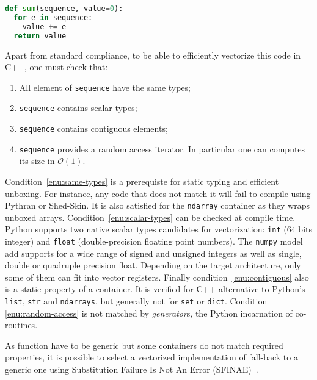 \documentclass[preprint]{sigplanconf}
\begin{document}
\begin{lstlisting}[language=python, label={lst:sum-py}, caption={Pseudo code of the \texttt{sum} intrinsic.}]
def sum(sequence, value=0):
  for e in sequence:
    value += e
  return value
\end{lstlisting}


Apart from standard compliance, to be able to efficiently vectorize this code in C++, one must check that:

\begin{enumerate}
    \item\label{enu:same-types} All element of \texttt{sequence} have the same types;
    \item\label{enu:scalar-types} \texttt{sequence} contains scalar types;
    \item\label{enu:contiguous} \texttt{sequence} contains contiguous elements;
    \item\label{enu:random-access} \texttt{sequence} provides a random access iterator. In particular one can computes its size in $\mathcal{O}(1)$.
\end{enumerate}

Condition~\ref{enu:same-types} is a prerequiste for static typing and efficient
unboxing. For instance, any code that does not match it will fail to compile
using Pythran or Shed-Skin. It is also satisfied for the \texttt{ndarray}
container as they wraps unboxed arrays. Condition~\ref{enu:scalar-types} can be
checked at compile time. Python supports two native scalar types candidates for
vectorization: \texttt{int} (64 bits integer) and \texttt{float}
(double-precision floating point numbers). The \texttt{numpy} model add supports for a
wide range of signed and unsigned integers as well as single, double or
quadruple precision float. Depending on the target architecture, only some of
them can fit into vector registers. Finally condition~\ref{enu:contiguous} also
is a static property of a container. It is verified for C++ alternative to
Python's \texttt{list}, \texttt{str} and \texttt{ndarrays}, but generally not
for \texttt{set} or \texttt{dict}. Condition \ref{enu:random-access} is not
matched by \emph{generator}s, the Python incarnation of co-routines.


As function have to be generic but some containers do not match required
properties, it is possible to select a vectorized
implementation of fall-back to a generic one using Substitution Failure
Is Not An Error (SFINAE)~\cite{metaprogramming2002}.
\end{document}
